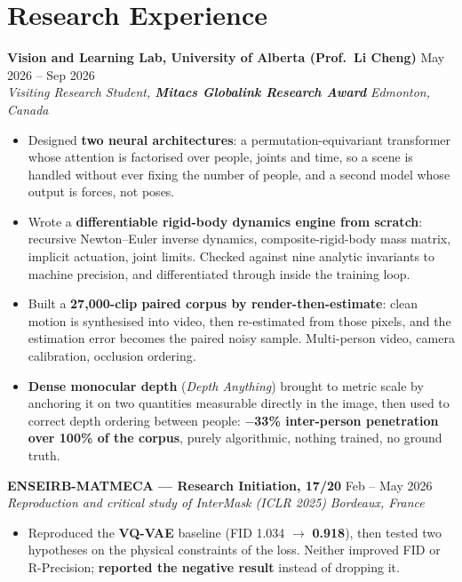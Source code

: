 \documentclass[10pt, letterpaper]{article}
\newcommand{\entry}[4]{%
  \noindent \textbf{#1} \hfill #2 \\
  \textit{#3} \hfill \textit{#4} \par
}
\begin{document}
\section{Research Experience}

\entry{Vision and Learning Lab, University of Alberta (Prof.\ Li Cheng)}{May 2026 -- Sep 2026}%
{Visiting Research Student, \textbf{Mitacs Globalink Research Award}}{Edmonton, Canada}
\begin{itemize}
    \item Designed \textbf{two neural architectures}: a permutation-equivariant transformer whose attention is factorised over people, joints and time, so a scene is handled without ever fixing the number of people, and a second model whose output is forces, not poses.
    \item Wrote a \textbf{differentiable rigid-body dynamics engine from scratch}: recursive Newton--Euler inverse dynamics, composite-rigid-body mass matrix, implicit actuation, joint limits. Checked against nine analytic invariants to machine precision, and differentiated through inside the training loop.
    \item Built a \textbf{27{,}000-clip paired corpus by render-then-estimate}: clean motion is synthesised into video, then re-estimated from those pixels, and the estimation error becomes the paired noisy sample. Multi-person video, camera calibration, occlusion ordering.
    \item \textbf{Dense monocular depth} (\textit{Depth Anything}) brought to metric scale by anchoring it on two quantities measurable directly in the image, then used to correct depth ordering between people: \textbf{$-$33\% inter-person penetration over 100\% of the corpus}, purely algorithmic, nothing trained, no ground truth.
\end{itemize}

\vspace{1pt}

\entry{ENSEIRB-MATMECA --- Research Initiation, 17/20}{Feb -- May 2026}%
{Reproduction and critical study of \textit{InterMask} (ICLR 2025)}{Bordeaux, France}
\begin{itemize}
    \item Reproduced the \textbf{VQ-VAE} baseline (FID 1.034 $\to$ \textbf{0.918}), then tested two hypotheses on the physical constraints of the loss. Neither improved FID or R-Precision; \textbf{reported the negative result} instead of dropping it.
\end{itemize}
\end{document}
